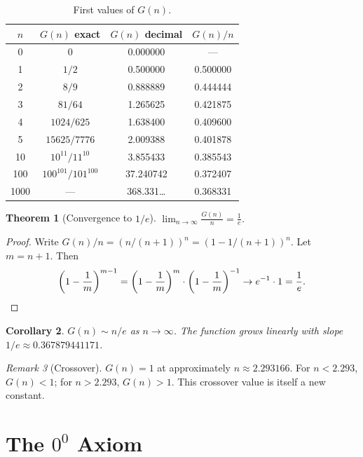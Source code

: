 \documentclass[11pt,a4paper]{article}
\newtheorem{theorem}{Theorem}[section]
\newtheorem{corollary}[theorem]{Corollary}
\theoremstyle{definition}
\theoremstyle{remark}
\newtheorem{remark}[theorem]{Remark}
\begin{document}
\begin{table}[ht]
\centering
\caption{First values of $G(n)$.}\label{tab:firstvalues}
\begin{tabular}{cccc}
\toprule
$n$ & $G(n)$ exact & $G(n)$ decimal & $G(n)/n$ \\
\midrule
0   & 0            & 0.000000       & ---      \\
1   & $1/2$        & 0.500000       & 0.500000 \\
2   & $8/9$        & 0.888889       & 0.444444 \\
3   & $81/64$      & 1.265625       & 0.421875 \\
4   & $1024/625$   & 1.638400       & 0.409600 \\
5   & $15625/7776$ & 2.009388       & 0.401878 \\
10  & $10^{11}/11^{10}$ & 3.855433  & 0.385543 \\
100 & $100^{101}/101^{100}$ & 37.240742 & 0.372407 \\
1000 & ---         & 368.331\ldots  & 0.368331 \\
\bottomrule
\end{tabular}
\end{table}

\begin{theorem}[Convergence to $1/e$]\label{thm:conv}
$\displaystyle\lim_{n \to \infty} \frac{G(n)}{n} = \frac{1}{e}$.
\end{theorem}

\begin{proof}
Write $G(n)/n = (n/(n+1))^{n} = (1 - 1/(n+1))^{n}$. Let $m = n+1$. Then
\[
  \left(1 - \frac{1}{m}\right)^{m-1}
  = \left(1 - \frac{1}{m}\right)^{m} \cdot \left(1 - \frac{1}{m}\right)^{-1}
  \to e^{-1} \cdot 1 = \frac{1}{e}.
  \qedhere
\]
\end{proof}

\begin{corollary}\label{cor:linear}
$G(n) \sim n/e$ as $n \to \infty$. The function grows linearly with slope $1/e \approx 0.367879441171$.
\end{corollary}

\begin{remark}[Crossover]\label{rem:crossover}
$G(n) = 1$ at approximately $n \approx 2.293166$. For $n < 2.293$, $G(n) < 1$; for $n > 2.293$, $G(n) > 1$. This crossover value is itself a new constant.
\end{remark}

\section{The \texorpdfstring{$0^{0}$}{0\^0} Axiom}\label{sec:axiom}
\end{document}
